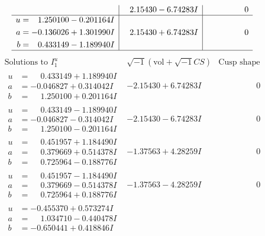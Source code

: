 \documentclass[1p]{elsarticle_modified}
\theoremstyle{definition}
\newcommand{\I}{\sqrt{-1}}
\begin{document}
$$\begin{array}{c|c|c}
 & \phantom{-}2.15430 - 6.74283 I & \phantom{-0.000000 } 0 \\ \hline\begin{aligned}
u &= \phantom{-}1.250100 - 0.201164 I \\
a &= -0.136026 + 1.301990 I \\
b &= \phantom{-}0.433149 - 1.189940 I\end{aligned}
 & \phantom{-}2.15430 + 6.74283 I & \phantom{-0.000000 } 0\\
 \hline 
 \end{array}$$\newpage$$\begin{array}{c|c|c}  
\text{Solutions to }I^u_{1}& \I (\text{vol} + \sqrt{-1}CS) & \text{Cusp shape}\\
 \hline 
\begin{aligned}
u &= \phantom{-}0.433149 + 1.189940 I \\
a &= -0.046827 + 0.314042 I \\
b &= \phantom{-}1.250100 + 0.201164 I\end{aligned}
 & -2.15430 + 6.74283 I & \phantom{-0.000000 } 0 \\ \hline\begin{aligned}
u &= \phantom{-}0.433149 - 1.189940 I \\
a &= -0.046827 - 0.314042 I \\
b &= \phantom{-}1.250100 - 0.201164 I\end{aligned}
 & -2.15430 - 6.74283 I & \phantom{-0.000000 } 0 \\ \hline\begin{aligned}
u &= \phantom{-}0.451957 + 1.184490 I \\
a &= \phantom{-}0.379669 + 0.514378 I \\
b &= \phantom{-}0.725964 - 0.188776 I\end{aligned}
 & -1.37563 + 4.28259 I & \phantom{-0.000000 } 0 \\ \hline\begin{aligned}
u &= \phantom{-}0.451957 - 1.184490 I \\
a &= \phantom{-}0.379669 - 0.514378 I \\
b &= \phantom{-}0.725964 + 0.188776 I\end{aligned}
 & -1.37563 - 4.28259 I & \phantom{-0.000000 } 0 \\ \hline\begin{aligned}
u &= -0.455370 + 0.573274 I \\
a &= \phantom{-}1.034710 - 0.440478 I \\
b &= -0.650441 + 0.418846 I\end{aligned}

\end{array}$$
\end{document}
